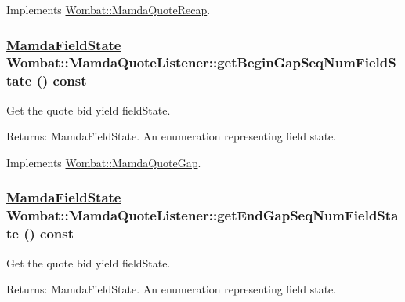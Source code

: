 Implements \hyperlink{classWombat_1_1MamdaQuoteRecap_475b6c9bd5ed474b3ac1e463cf199d8c}{Wombat::Mamda\-Quote\-Recap}.\hypertarget{classWombat_1_1MamdaQuoteListener_7b146afc82cbcba47503e2720fd4ac5e}{
\subsubsection[getBeginGapSeqNumFieldState]{\setlength{\rightskip}{0pt plus 5cm}\hyperlink{namespaceWombat_93aac974f2ab713554fd12a1fa3b7d2a}{Mamda\-Field\-State} Wombat::Mamda\-Quote\-Listener::get\-Begin\-Gap\-Seq\-Num\-Field\-State () const}}
\label{classWombat_1_1MamdaQuoteListener_7b146afc82cbcba47503e2720fd4ac5e}


Get the quote bid yield field\-State. 

\begin{Desc}
\item[Returns:]Mamda\-Field\-State. An enumeration representing field state. \end{Desc}


Implements \hyperlink{classWombat_1_1MamdaQuoteGap_3fef0c397fa74bb7bdd1102002869012}{Wombat::Mamda\-Quote\-Gap}.\hypertarget{classWombat_1_1MamdaQuoteListener_65056fc3d3db0cb1eef24134de986b33}{
\subsubsection[getEndGapSeqNumFieldState]{\setlength{\rightskip}{0pt plus 5cm}\hyperlink{namespaceWombat_93aac974f2ab713554fd12a1fa3b7d2a}{Mamda\-Field\-State} Wombat::Mamda\-Quote\-Listener::get\-End\-Gap\-Seq\-Num\-Field\-State () const}}
\label{classWombat_1_1MamdaQuoteListener_65056fc3d3db0cb1eef24134de986b33}


Get the quote bid yield field\-State. 

\begin{Desc}
\item[Returns:]Mamda\-Field\-State. An enumeration representing field state. \end{Desc}


